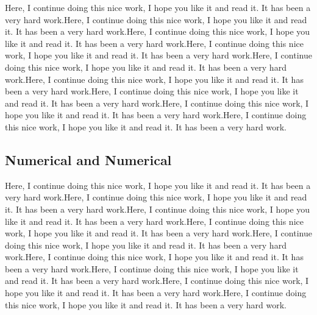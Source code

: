 \documentclass[11pt]{article}
\begin{document}
Here, I continue doing this nice work, I hope you like it and read it. It has been a very hard work.Here, I continue doing this nice work, I hope you like it and read it. It has been a very hard work.Here, I continue doing this nice work, I hope you like it and read it. It has been a very hard work.Here, I continue doing this nice work, I hope you like it and read it. It has been a very hard work.Here, I continue doing this nice work, I hope you like it and read it. It has been a very hard work.Here, I continue doing this nice work, I hope you like it and read it. It has been a very hard work.Here, I continue doing this nice work, I hope you like it and read it. It has been a very hard work.Here, I continue doing this nice work, I hope you like it and read it. It has been a very hard work.Here, I continue doing this nice work, I hope you like it and read it. It has been a very hard work.

\subsection{Numerical and Numerical}\label{binumnum}

Here, I continue doing this nice work, I hope you like it and read it. It has been a very hard work.Here, I continue doing this nice work, I hope you like it and read it. It has been a very hard work.Here, I continue doing this nice work, I hope you like it and read it. It has been a very hard work.Here, I continue doing this nice work, I hope you like it and read it. It has been a very hard work.Here, I continue doing this nice work, I hope you like it and read it. It has been a very hard work.Here, I continue doing this nice work, I hope you like it and read it. It has been a very hard work.Here, I continue doing this nice work, I hope you like it and read it. It has been a very hard work.Here, I continue doing this nice work, I hope you like it and read it. It has been a very hard work.Here, I continue doing this nice work, I hope you like it and read it. It has been a very hard work.
\end{document}
